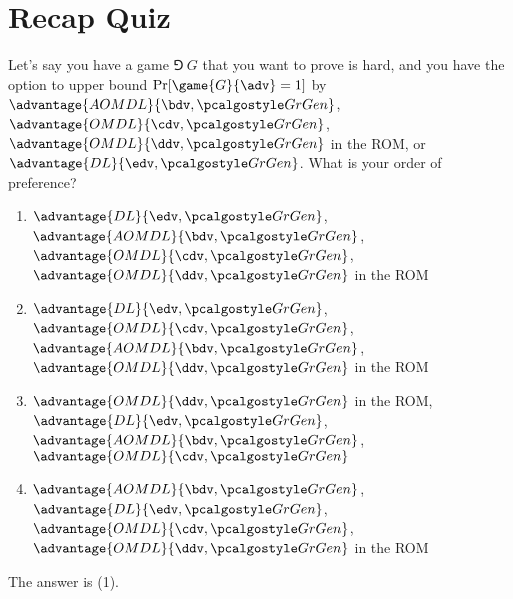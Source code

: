 \section{Recap Quiz}\label{sec:recap-quiz}

\begin{exercise}
  Let's say you have a game $\Game~G$ that you want to prove is hard, and you have the option to upper bound $\Pr[\game{G}{\adv} = 1]$ by $\advantage{AOMDL}{\bdv, \grgen}$, $\advantage{OMDL}{\cdv, \grgen}$, $\advantage{OMDL}{\ddv, \grgen}$ in the ROM, or $\advantage{DL}{\edv, \grgen}$.
  What is your order of preference?
  \begin{enumerate}
    \item $\advantage{DL}{\edv, \grgen}$, $\advantage{AOMDL}{\bdv, \grgen}$, $\advantage{OMDL}{\cdv, \grgen}$, $\advantage{OMDL}{\ddv, \grgen}$ in the ROM
    \item $\advantage{DL}{\edv, \grgen}$, $\advantage{OMDL}{\cdv, \grgen}$, $\advantage{AOMDL}{\bdv, \grgen}$, $\advantage{OMDL}{\ddv, \grgen}$ in the ROM
    \item $\advantage{OMDL}{\ddv, \grgen}$ in the ROM, $\advantage{DL}{\edv, \grgen}$, $\advantage{AOMDL}{\bdv, \grgen}$, $\advantage{OMDL}{\cdv, \grgen}$
    \item $\advantage{AOMDL}{\bdv, \grgen}$, $\advantage{DL}{\edv, \grgen}$, $\advantage{OMDL}{\cdv, \grgen}$, $\advantage{OMDL}{\ddv, \grgen}$ in the ROM
  \end{enumerate}
\end{exercise}

\ifsolutions
\begin{mysolution}
  The answer is (1).
\end{mysolution}
\fi

